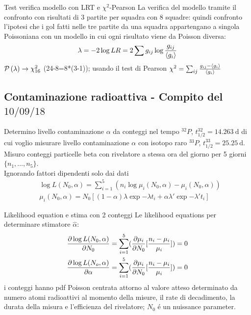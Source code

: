 \documentclass[asd-beamer.tex]{subfiles}
\begin{document}
\begin{frame}{Test verifica modello con LRT e $\chi^2$-Pearson}
La verifica del modello tramite il confronto con risultati di 3 partite per squadra con 8 squadre: quindi confronto l'ipotesi che i gol fatti nelle tre partite da una squadra appartengano a singola Poissoniana con un modello in cui ogni risultato viene da Poisson diversa:
\[\lambda=-2\log{LR}=2\sum g_{ij}\log{\frac{g_{ij}}{\exv{g_i}}}\]
$\prob{(\lambda)}\to\chi^2_{16}$ (24-8=8*(3-1)); usando il test di Pearson $\chi^2=\sum_{ij}\frac{g_{ij}-\exv{g_i}}{\exv{g_i}}$
\end{frame}

\subsection{Contaminazione radioattiva - Compito del $10/09/18$}

\begin{frame}{Determino livello contaminazione $\alpha$ da conteggi nel tempo}
$^{32}P$, $t_{1/2}^{32}=\SI{14.263}{\day}$ di cui voglio misurare livello contaminazione $\alpha$ con isotopo raro $^{33}P$, $t_{1/2}^{33}=\SI{25.25}{\day}$. Misuro conteggi particelle beta con rivelatore a stessa ora del giorno per 5 giorni $\{n_1,\ldots,n_5\}$.\\
Ignorando fattori dipendenti solo dai dati
\begin{align*}
&\log{L(N_0,\alpha)}=\sum_{i=1}^5(n_i\log{\mu_i(N_0,\alpha)}-\mu_i(N_0,\alpha))\\
&\mu_i(N_0,\alpha)=N_0[(1-\alpha)\lambda\exp{-\lambda t_i}+\alpha\lambda'\exp{-\lambda't_i}]
\end{align*}
\end{frame}

\begin{frame}{Likelihood equation e stima con 2 conteggi}
Le likelihood equations per determinare stimatore $\hat{\alpha}$:
\begin{align*}
&\PDy{N_0}{\log{L(N_0,\alpha)}}=\sum_{i=1}^5(\PDy{N_0}{\mu_i}[\frac{n_i-\mu_i}{\mu_i}])=0\\
&\PDy{\alpha}{\log{L(N_o,\alpha)}}=\sum_{i=1}^5(\PDy{N_0}{\mu_i}[\frac{n_i-\mu_i}{\mu_i}])=0
\end{align*}
i conteggi hanno pdf Poisson centrata attorno al valore atteso determinato da numero atomi radioattivi al momento della misure, il rate di decadimento, la durata della misura e l'efficienza del rivelatore; $N_0$ \'e un nuissance parameter.
\end{frame}
\end{document}

